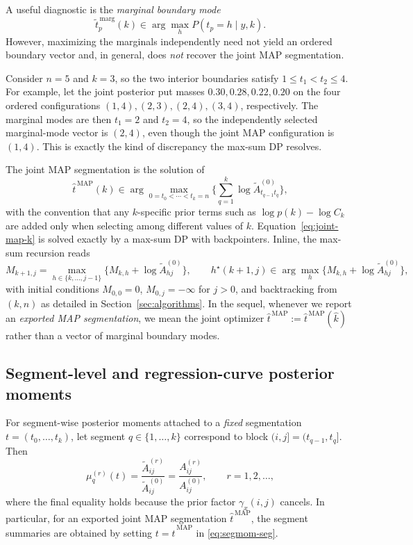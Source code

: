 A useful diagnostic is the \emph{marginal boundary mode}
\[
\widetilde{t}^{\,\mathrm{marg}}_p(k)
  \in \arg\max_h P(t_p=h\mid y,k).
\]
However, maximizing the marginals independently need not yield an ordered boundary vector and, in
general, does \emph{not} recover the joint MAP segmentation.

\begin{remark}
\label{rem:marg-vs-joint}
Consider $n=5$ and $k=3$, so the two interior boundaries satisfy $1\le t_1<t_2\le4$.
For example, let the joint posterior put masses $0.30,0.28,0.22,0.20$ on the four ordered
configurations $(1,4),(2,3),(2,4),(3,4)$, respectively. The marginal modes are then
$t_1=2$ and $t_2=4$, so the independently selected marginal-mode vector is $(2,4)$, even though
the joint MAP configuration is $(1,4)$. This is exactly the kind of discrepancy the max-sum DP
resolves.
\end{remark}

The joint MAP segmentation is the solution of
\begin{equation}
\widehat{t}^{\,\mathrm{MAP}}(k)
 \in \arg\max_{0=t_0<\cdots<t_k=n}
 \Bigg\{\sum_{q=1}^k \log \widetilde{A}^{(0)}_{t_{q-1} t_q}\Bigg\},
\label{eq:joint-map-k}
\end{equation}
with the convention that any $k$-specific prior terms such as $\log p(k)-\log C_k$ are added only
when selecting among different values of $k$. Equation~\eqref{eq:joint-map-k} is solved exactly by
a max-sum DP with backpointers. Inline, the max-sum recursion reads
\begin{equation}
M_{k+1,j} = \max_{h\in\{k,\dots,j-1\}}\big\{M_{k,h} + \log \widetilde{A}^{(0)}_{hj}\big\},
\qquad
h^\star(k+1,j) \in \arg\max_{h} \big\{M_{k,h} + \log \widetilde{A}^{(0)}_{hj}\big\},
\label{eq:max-sum-inline}
\end{equation}
with initial conditions $M_{0,0}=0$, $M_{0,j}=-\infty$ for $j>0$, and backtracking from
$(k,n)$ as detailed in Section~\ref{sec:algorithms}.
In the sequel, whenever we report an \emph{exported MAP segmentation}, we mean the joint optimizer
$\widehat{t}^{\,\mathrm{MAP}}:=\widehat{t}^{\,\mathrm{MAP}}(\widehat{k})$ rather than a vector of marginal
boundary modes.

\subsection{Segment-level and regression-curve posterior moments}
For segment-wise posterior moments attached to a \emph{fixed} segmentation
$t=(t_0,\dots,t_k)$, let segment $q\in\{1,\dots,k\}$ correspond to block
$(i,j]=(t_{q-1},t_q]$. Then
\begin{equation}
\mu^{(r)}_q(t)
 = \frac{\widetilde{A}^{(r)}_{ij}}{\widetilde{A}^{(0)}_{ij}}
 = \frac{A^{(r)}_{ij}}{A^{(0)}_{ij}},
\qquad r=1,2,\dots,
\label{eq:segmom-seg}
\end{equation}
where the final equality holds because the prior factor $\gamma_x(i,j)$ cancels. In particular, for
an exported joint MAP segmentation $\widehat{t}^{\,\mathrm{MAP}}$, the segment summaries are obtained by
setting $t=\widehat{t}^{\,\mathrm{MAP}}$ in \eqref{eq:segmom-seg}.

